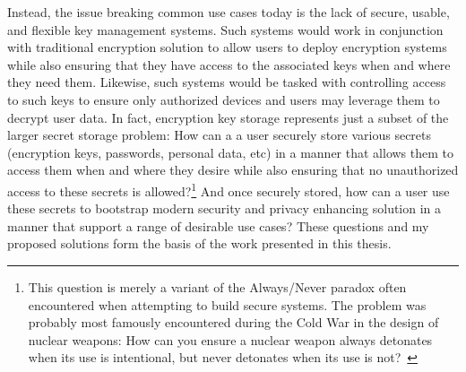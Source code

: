 Instead, the issue breaking common use cases today is the lack of
secure, usable, and flexible key management systems. Such systems
would work in conjunction with traditional encryption solution to
allow users to deploy encryption systems while also ensuring that they
have access to the associated keys when and where they need
them. Likewise, such systems would be tasked with controlling access
to such keys to ensure only authorized devices and users may leverage
them to decrypt user data. In fact, encryption key storage represents
just a subset of the larger secret storage problem: How can a a user
securely store various secrets (encryption keys, passwords, personal
data, etc) in a manner that allows them to access them when and where
they desire while also ensuring that no unauthorized access to these
secrets is allowed?\footnote{This question is merely a variant of the
  Always/Never paradox often encountered when attempting to build
  secure systems. The problem was probably most famously encountered
  during the Cold War in the design of nuclear weapons: How can you
  ensure a nuclear weapon always detonates when its use is
  intentional, but never detonates when its use is
  not?~\cite{schlosser2013}} And once securely stored, how can a user
use these secrets to bootstrap modern security and privacy enhancing
solution in a manner that support a range of desirable use cases?
These questions and my proposed solutions form the basis of the work
presented in this thesis.

